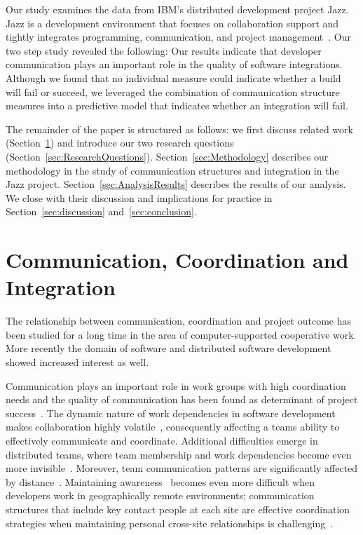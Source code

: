 Our study examines the data from IBM's distributed development project Jazz. Jazz
is a development environment that focuses on collaboration support and tightly
integrates programming, communication, and project
management~\cite{frost:ieeesoftware:2007}. Our two step study revealed the following: Our
results indicate that developer communication plays an important role in the
quality of software integrations. Although we found that no individual measure
could indicate whether a build will fail or succeed, we leveraged the combination
of communication structure measures into a predictive model that indicates
whether an integration will fail.

The remainder of the paper is structured as follows: we first discuss related
work (Section~\ref{sec:RelatedCommunication}) and introduce our two research
questions (Section~\ref{sec:ResearchQuestions}). Section~\ref{sec:Methodology}
describes our methodology in the study of communication structures and
integration in the Jazz project. Section~\ref{sec:AnalysisResults} describes the
results of our analysis. We close with their discussion and implications for
practice in Section~\ref{sec:discussion} and~\ref{sec:conclusion}.



\section{Communication, Coordination and Integration}
\label{sec:RelatedCommunication}

The relationship between communication, coordination and project outcome has been
studied for a long time in the area of computer-supported cooperative work. More
recently the domain of software and distributed software development showed
increased interest as well.

Communication plays an important role in work groups with high coordination needs
and the quality of communication has been found as determinant of project
success~\cite{curtis:acm:1988,kraut:1995coordination}. The dynamic nature
of work dependencies in software development makes collaboration highly
volatile~\cite{Cataldo:2007hb}, consequently affecting a teams ability to
effectively communicate and coordinate. Additional difficulties emerge in
distributed teams, where team membership and work dependencies become even more
invisible~\cite{damian:icgse:2007}. Moreover, team communication patterns are
significantly affected by distance~\cite{hinds:cscw:2006}. Maintaining
awareness~\cite{sarma:2006icgse} becomes even more difficult when developers work
in geographically remote environments; communication structures that include key
contact people at each site are effective coordination strategies when
maintaining personal cross-site relationships is challenging~\cite{hinds:cscw:2006}.

